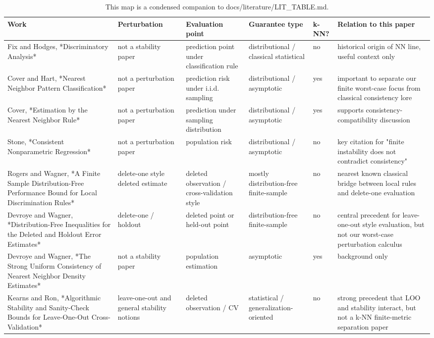 \begin{table}[t]
\centering
\small
\begin{tabular}{llllll}
\toprule
Work & Perturbation & Evaluation point & Guarantee type & k-NN? & Relation to this paper \\
\midrule
Fix and Hodges, *Discriminatory Analysis* & not a stability paper & prediction point under classification rule & distributional / classical statistical & no & historical origin of NN line, useful context only \\
Cover and Hart, *Nearest Neighbor Pattern Classification* & not a perturbation paper & prediction risk under i.i.d. sampling & distributional / asymptotic & yes & important to separate our finite worst-case focus from classical consistency lore \\
Cover, *Estimation by the Nearest Neighbor Rule* & not a perturbation paper & prediction under sampling distribution & distributional / asymptotic & yes & supports consistency-compatibility discussion \\
Stone, *Consistent Nonparametric Regression* & not a perturbation paper & population risk & distributional / asymptotic & no & key citation for "finite instability does not contradict consistency" \\
Rogers and Wagner, *A Finite Sample Distribution-Free Performance Bound for Local Discrimination Rules* & delete-one style deleted estimate & deleted observation / cross-validation style & mostly distribution-free finite-sample & no & nearest known classical bridge between local rules and delete-one evaluation \\
Devroye and Wagner, *Distribution-Free Inequalities for the Deleted and Holdout Error Estimates* & delete-one / holdout & deleted point or held-out point & distribution-free finite-sample & no & central precedent for leave-one-out style evaluation, but not our worst-case perturbation calculus \\
Devroye and Wagner, *The Strong Uniform Consistency of Nearest Neighbor Density Estimates* & not a stability paper & population estimation & asymptotic & yes & background only \\
Kearns and Ron, *Algorithmic Stability and Sanity-Check Bounds for Leave-One-Out Cross-Validation* & leave-one-out and general stability notions & deleted observation / CV & statistical / generalization-oriented & no & strong precedent that LOO and stability interact, but not a k-NN finite-metric separation paper \\
\bottomrule
\end{tabular}
\caption*{\footnotesize This map is a condensed companion to docs/literature/LIT\_TABLE.md.}
\end{table}
